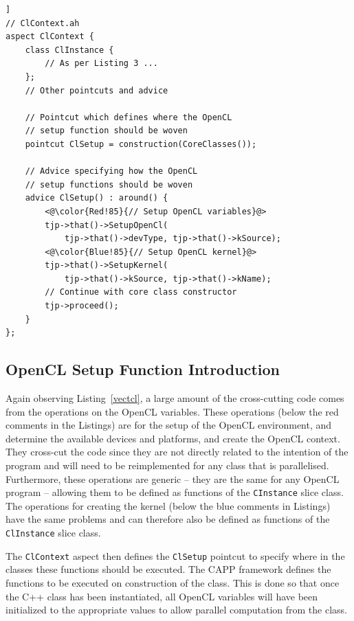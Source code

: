 \documentclass{sig-alternate-05-2015}
\begin{document}
\begin{lstlisting}[caption=Abstract aspect with the pointcut and advice for
OpenCL setup.,label=clsetup,float=[!t]]
// ClContext.ah
aspect ClContext {
	class ClInstance {
		// As per Listing 3 ...
	};
	// Other pointcuts and advice

	// Pointcut which defines where the OpenCL
	// setup function should be woven
	pointcut ClSetup = construction(CoreClasses());
  
	// Advice specifying how the OpenCL
	// setup functions should be woven
	advice ClSetup() : around() {
		<@\color{Red!85}{// Setup OpenCL variables}@>
		tjp->that()->SetupOpenCl(
			tjp->that()->devType, tjp->that()->kSource);
		<@\color{Blue!85}{// Setup OpenCL kernel}@>
		tjp->that()->SetupKernel(
			tjp->that()->kSource, tjp->that()->kName); 
		// Continue with core class constructor
		tjp->proceed();
	}
};
\end{lstlisting}

\subsection{OpenCL Setup Function Introduction}

Again observing Listing~\ref{vectcl}, a large amount of the cross-cutting code
comes from the operations on the OpenCL variables. These operations (below the
red comments in the Listings) are for the setup of the OpenCL environment, and 
determine the available devices and platforms, and create the OpenCL context. They
cross-cut the \CPP code since they are not directly related to the intention of the
program and will need to be reimplemented for any class that is parallelised. Furthermore, 
these operations are generic -- they are the same for any 
OpenCL program -- allowing them to be defined as functions of the \lstinline$CInstance$
slice class. The operations for creating the kernel (below the blue 
comments in Listings) have the same problems and can therefore also be defined
as functions of the \lstinline$ClInstance$ slice class. 

The \lstinline$ClContext$ aspect then defines the \lstinline$ClSetup$ pointcut to
specify where in the \CPP classes these functions should be executed. The
 CAPP framework defines the functions to be executed on construction of the
\CPP class. This is done so that once the C++ class has been instantiated,
all OpenCL variables will have been initialized to the appropriate values to allow
parallel computation from the \CPP class. 
\end{document}
